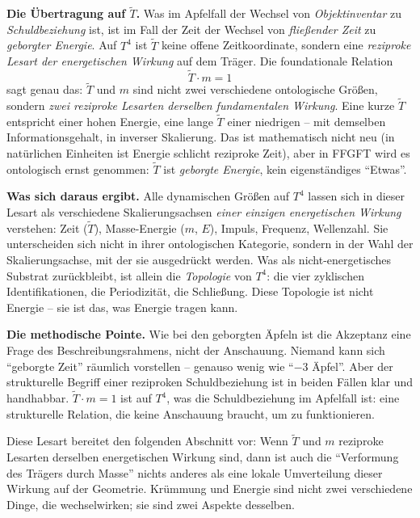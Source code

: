 \textbf{Die Übertragung auf $\tilde T$.} Was im Apfelfall der Wechsel
von \emph{Objektinventar} zu \emph{Schuldbeziehung} ist, ist im Fall
der Zeit der Wechsel von \emph{fließender Zeit} zu \emph{geborgter
Energie}. Auf $T^4$ ist $\tilde T$ keine offene Zeitkoordinate,
sondern eine \emph{reziproke Lesart der energetischen Wirkung} auf dem
Träger. Die foundationale Relation
\begin{equation}
  \tilde T \cdot m = 1
\end{equation}
sagt genau das: $\tilde T$ und $m$ sind nicht zwei verschiedene
ontologische Größen, sondern \emph{zwei reziproke Lesarten derselben
fundamentalen Wirkung}. Eine kurze $\tilde T$ entspricht einer hohen
Energie, eine lange $\tilde T$ einer niedrigen -- mit demselben
Informationsgehalt, in inverser Skalierung. Das ist mathematisch
nicht neu (in natürlichen Einheiten ist Energie schlicht reziproke
Zeit), aber in FFGFT wird es ontologisch ernst genommen: $\tilde T$
ist \emph{geborgte Energie}, kein eigenständiges \enquote{Etwas}.

\textbf{Was sich daraus ergibt.} Alle dynamischen Größen auf $T^4$
lassen sich in dieser Lesart als verschiedene Skalierungsachsen
\emph{einer einzigen energetischen Wirkung} verstehen: Zeit
($\tilde T$), Masse-Energie ($m$, $E$), Impuls, Frequenz, Wellenzahl.
Sie unterscheiden sich nicht in ihrer ontologischen Kategorie,
sondern in der Wahl der Skalierungsachse, mit der sie ausgedrückt
werden. Was als nicht-energetisches Substrat zurückbleibt, ist
allein die \emph{Topologie} von $T^4$: die vier zyklischen
Identifikationen, die Periodizität, die Schließung. Diese Topologie
ist nicht Energie -- sie ist das, was Energie tragen kann.

\textbf{Die methodische Pointe.} Wie bei den geborgten Äpfeln ist die
Akzeptanz eine Frage des Beschreibungsrahmens, nicht der Anschauung.
Niemand kann sich \enquote{geborgte Zeit} räumlich vorstellen --
genauso wenig wie \enquote{$-3$ Äpfel}. Aber der strukturelle
Begriff einer reziproken Schuldbeziehung ist in beiden Fällen klar
und handhabbar. $\tilde T \cdot m = 1$ ist auf $T^4$, was die
Schuldbeziehung im Apfelfall ist: eine strukturelle Relation, die
keine Anschauung braucht, um zu funktionieren.

Diese Lesart bereitet den folgenden Abschnitt vor: Wenn $\tilde T$
und $m$ reziproke Lesarten derselben energetischen Wirkung sind,
dann ist auch die \enquote{Verformung des Trägers durch Masse}
nichts anderes als eine lokale Umverteilung dieser Wirkung auf der
Geometrie. Krümmung und Energie sind nicht zwei verschiedene Dinge,
die wechselwirken; sie sind zwei Aspekte desselben.

